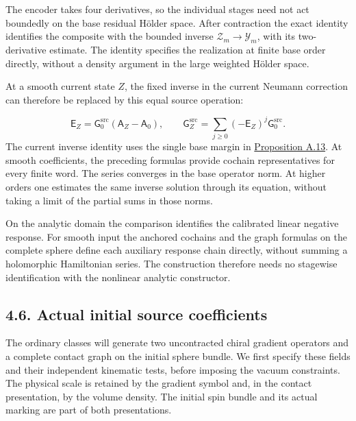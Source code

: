 \documentclass[
  english,
  11pt,
  reqno]{amsart}
\begin{document}
The encoder takes four derivatives, so the individual stages need not
act boundedly on the base residual Hölder space. After contraction the
exact identity identifies the composite with the bounded inverse
\(\mathcal Z_m\to\mathcal Y_m\), with its two-derivative estimate. The
identity specifies the realization at finite base order directly,
without a density argument in the large weighted Hölder space.

At a smooth current state \(Z\), the fixed inverse in the current
Neumann correction can therefore be replaced by this equal source
operation:

\label{eq:online-negative-response-current-inverse-word}
\[
\mathsf E_Z=\mathsf G_0^{\mathrm{src}}(\mathsf A_Z-\mathsf A_0),
\qquad
\mathsf G_Z^{\mathrm{src}}
=\sum_{j\ge0}(-\mathsf E_Z)^j\mathsf G_0^{\mathrm{src}}.
\] The current inverse identity uses the single base margin in
\hyperref[prop:online-current-inverse-horizontal-flatness]{Proposition
A.13}. At smooth coefficients, the preceding formulas provide cochain
representatives for every finite word. The series converges in the base
operator norm. At higher orders one estimates the same inverse solution
through its equation, without taking a limit of the partial sums in
those norms.

On the analytic domain the comparison identifies the calibrated linear negative response. For smooth input the anchored cochains and the graph formulas on the complete sphere define each auxiliary response chain directly, without summing a holomorphic Hamiltonian series. The construction therefore needs no stagewise identification with the nonlinear analytic constructor.

\subsection{4.6. Actual initial source
coefficients}\label{actual-initial-source-coefficients}\label{sec:online-actual-initial-source-carriers}

The ordinary classes will generate two uncontracted chiral gradient
operators and a complete contact graph on the initial sphere bundle. We
first specify these fields and their independent kinematic tests, before
imposing the vacuum constraints. The physical scale is retained by the
gradient symbol and, in the contact presentation, by the volume density.
The initial spin bundle and its actual marking are part of both
presentations.
\end{document}
